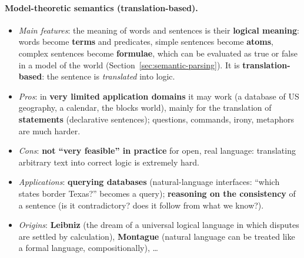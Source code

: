 \paragraph{Model-theoretic semantics (translation-based).}
\begin{itemize}[nosep]
  \item \emph{Main features}: the meaning of words and sentences is their
        \textbf{logical meaning}: words become \textbf{terms} and predicates, simple
        sentences become \textbf{atoms}, complex sentences become \textbf{formulae},
        which can be evaluated as true or false in a model of the world
        (Section~\ref{sec:semantic-parsing}). It is \textbf{translation-based}: the
        sentence is \emph{translated} into logic.
  \item \emph{Pros}: in \textbf{very limited application domains} it may work (a database
        of US geography, a calendar, the blocks world), mainly for the translation of
        \textbf{statements} (declarative sentences); questions, commands, irony,
        metaphors are much harder.
  \item \emph{Cons}: \textbf{not ``very feasible'' in practice} for open, real language:
        translating arbitrary text into correct logic is extremely hard.
  \item \emph{Applications}: \textbf{querying databases} (natural-language interfaces:
        ``which states border Texas?'' becomes a query); \textbf{reasoning on the
        consistency} of a sentence (is it contradictory? does it follow from what we
        know?).
  \item \emph{Origins}: \textbf{Leibniz} (the dream of a universal logical language in
        which disputes are settled by calculation), \textbf{Montague} (natural language
        can be treated like a formal language, compositionally), \ldots
\end{itemize}

